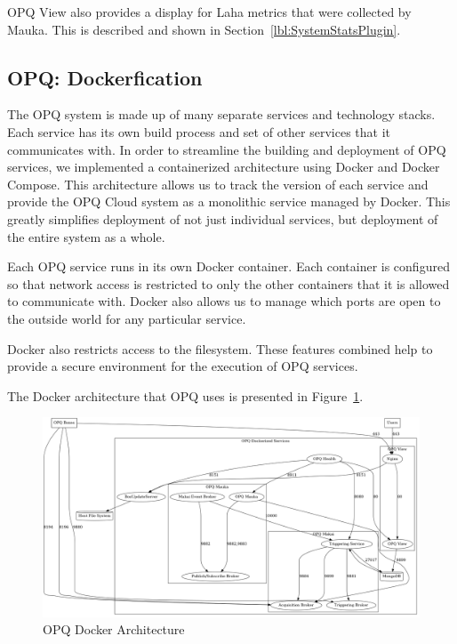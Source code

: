 OPQ View also provides a display for Laha metrics that were collected by Mauka. This is described and shown in Section~\ref{lbl:SystemStatsPlugin}.

\subsection{OPQ: Dockerfication}\label{subsec:opq:-dockerfication}
The OPQ system is made up of many separate services and technology stacks. Each service has its own build process and set of other services that it communicates with. In order to streamline the building and deployment of OPQ services, we implemented a containerized architecture using Docker and Docker Compose. This architecture allows us to track the version of each service and provide the OPQ Cloud system as a monolithic service managed by Docker. This greatly simplifies deployment of not just individual services, but deployment of the entire system as a whole.

Each OPQ service runs in its own Docker container. Each container is configured so that network access is restricted to only the other containers that it is allowed to communicate with. Docker also allows us to manage which ports are open to the outside world for any particular service.

Docker also restricts access to the filesystem. These features combined help to provide a secure environment for the execution of OPQ services.

The Docker architecture that OPQ uses is presented in Figure~\ref{fig:docker_deploy}.

\begin{figure}
	\centering
	\includegraphics[width=1\linewidth]{figures/docker_deploy.png}
	\caption{OPQ Docker Architecture}\label{fig:docker_deploy}
\end{figure}

